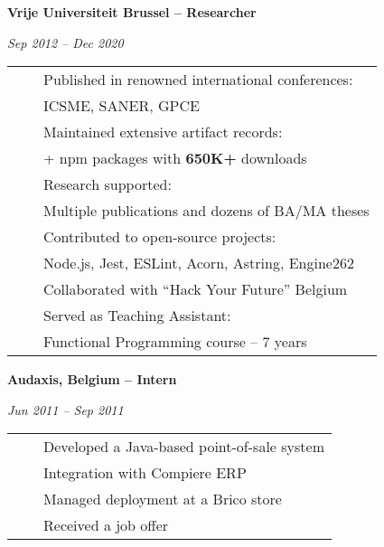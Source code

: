 \documentclass[a4paper,11pt,english]{article}
\newcommand{\RightColumn}[0]{10.5cm}
\newcommand{\ItemSkip}[0]{4pt}
\newcommand{\SubItemSkip}[0]{0pt}
\newcommand{\SubSubItemSkip}[0]{0pt}
\newcommand{\Bullet}[0]{\faCaretRight~~}
\newcommand{\BeginSubRubricSkip}[0]{6pt}
\newcommand{\EndSubRubric}[0]{\vspace{4pt}}
\newcommand{\SubRubric}[1]{\parbox{\linewidth}{\sffamily\bfseries{}#1}}
\begin{document}
\begin{minipage}[t]{\RightColumn}
\SubRubric{Vrije Universiteit Brussel -- Researcher}
\emph{Sep 2012 -- Dec 2020} \\[\BeginSubRubricSkip]
\begin{tabularx}{\linewidth}{@{}l@{}l@{}}
\Bullet & Published in renowned international conferences: \\[\SubSubItemSkip]
& \quad ICSME, SANER, GPCE \\[\ItemSkip]
\Bullet & Maintained extensive artifact records: \\[\SubSubItemSkip]
& \quad 60+ npm packages with \textbf{650K+} downloads \\[\ItemSkip]
\Bullet & Research supported: \\[\SubSubItemSkip]
& \quad Multiple publications and dozens of BA/MA theses \\[\ItemSkip]
\Bullet & Contributed to open-source projects: \\[\SubSubItemSkip]
& \quad Node.js, Jest, ESLint, Acorn, Astring, Engine262 \\[\ItemSkip]
\Bullet & Collaborated with ``Hack Your Future'' Belgium \\[\ItemSkip]
\Bullet & Served as Teaching Assistant: \\[\SubSubItemSkip]
& \quad Functional Programming course -- 7 years \\[\ItemSkip]
\end{tabularx}
\EndSubRubric{}

\SubRubric{Audaxis, Belgium -- Intern}
\emph{Jun 2011 -- Sep 2011} \\[\BeginSubRubricSkip]
\begin{tabularx}{\linewidth}{@{}l@{}l@{}}
\Bullet & Developed a Java-based point-of-sale system \\[\SubItemSkip]
& Integration with Compiere ERP \\[\SubItemSkip]
& Managed deployment at a Brico store \\[\ItemSkip]
\Bullet & Received a job offer \\[\ItemSkip]
\end{tabularx}
\EndSubRubric{}

\end{minipage}

\newpage
\end{document}
